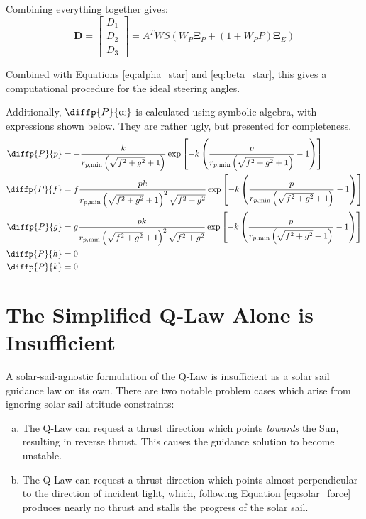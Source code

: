 Combining everything together gives:
\begin{equation}
  \boldsymbol{D} = \begin{bmatrix}
    D_1 \\D_2\\D_3
  \end{bmatrix} = A^T W S \left(W_P \boldsymbol{\Xi}_P + (1 + W_P P) \boldsymbol{\Xi}_E \right)
\end{equation}

Combined with Equations \ref{eq:alpha_star} and \ref{eq:beta_star}, this gives a computational procedure for the ideal steering angles.

Additionally, \(\diffp{P}{{\moe}}\) is calculated using symbolic algebra, with expressions shown below. They are rather ugly, but presented for completeness.
\begin{align*}
  \diffp{P}{p} & = -\frac{k}{r_{p, \min } \,{\left(\sqrt{f^2 +g^2 }+1\right)}}\exp\left[-k\,{\left(\frac{p}{r_{p, \min } \,{\left(\sqrt{f^2 +g^2 }+1\right)}}-1\right)}\right]                         \\
  \diffp{P}{f} & = f\frac{pk}{r_{p, \min } \,{{\left(\sqrt{f^2 +g^2 }+1\right)}}^2 \,\sqrt{f^2 +g^2 }}\exp\left[-k\,{\left(\frac{p}{r_{p, \min } \,{\left(\sqrt{f^2 +g^2 }+1\right)}}-1\right)}\right] \\
  \diffp{P}{g} & =g \frac{pk}{r_{p, \min } \,{{\left(\sqrt{f^2 +g^2 }+1\right)}}^2 \,\sqrt{f^2 +g^2 }}\exp\left[-k\,{\left(\frac{p}{r_{p, \min } \,{\left(\sqrt{f^2 +g^2 }+1\right)}}-1\right)}\right] \\
  \diffp{P}{h} & = 0                                                                                                                                                                                   \\
  \diffp{P}{k} & = 0
\end{align*}

\section{The Simplified Q-Law Alone is Insufficient}
\label{sec:insufficient}
A solar-sail-agnostic formulation of the Q-Law is insufficient as a solar sail guidance law on its own. There are two notable problem cases which arise from ignoring solar sail attitude constraints:
\begin{enumerate}[(a)]
  \item The Q-Law can request a thrust direction which points \textit{towards} the Sun, resulting in reverse thrust. This causes the guidance solution to become unstable.
  \item The Q-Law can request a thrust direction which points almost perpendicular to the direction of incident light, which, following Equation \ref{eq:solar_force} produces nearly no thrust and stalls the progress of the solar sail.
\end{enumerate}

